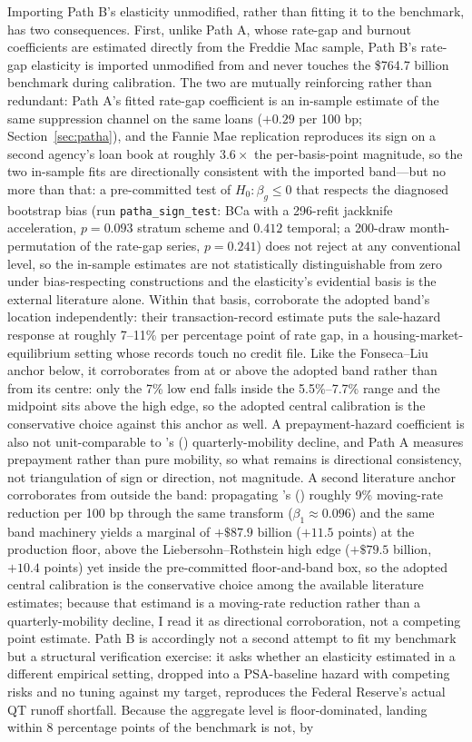 \documentclass[12pt]{article}
\newcommand{\citepos}[1]{\citeauthor{#1}'s (\citeyear{#1})}
\begin{document}
Importing Path B's elasticity unmodified, rather than fitting it to the benchmark, has two consequences. First, unlike Path A, whose rate-gap and burnout coefficients are estimated directly from the Freddie Mac sample, Path B's rate-gap elasticity is imported unmodified from \citet{liebersohn2024} and never touches the \$764.7 billion benchmark during calibration. The two are mutually reinforcing rather than redundant: Path A's fitted rate-gap coefficient is an in-sample estimate of the same suppression channel on the same loans ($+0.29$ per 100 bp; Section~\ref{sec:patha}), and the Fannie Mae replication reproduces its sign on a second agency's loan book at roughly $3.6\times$ the per-basis-point magnitude, so the two in-sample fits are directionally consistent with the imported band---but no more than that: a pre-committed test of $H_0\!: \beta_g \le 0$ that respects the diagnosed bootstrap bias (run \texttt{patha\_sign\_test}: BCa with a 296-refit jackknife acceleration, $p = 0.093$ stratum scheme and $0.412$ temporal; a 200-draw month-permutation of the rate-gap series, $p = 0.241$) does not reject at any conventional level, so the in-sample estimates are not statistically distinguishable from zero under bias-respecting constructions and the elasticity's evidential basis is the external literature alone. Within that basis, \citet{graybill2026} corroborate the adopted band's location independently: their transaction-record estimate puts the sale-hazard response at roughly 7--11\% per percentage point of rate gap, in a housing-market-equilibrium setting whose records touch no credit file. Like the Fonseca--Liu anchor below, it corroborates from at or above the adopted band rather than from its centre: only the 7\% low end falls inside the 5.5\%--7.7\% range and the midpoint sits above the high edge, so the adopted central calibration is the conservative choice against this anchor as well. A prepayment-hazard coefficient is also not unit-comparable to \citepos{liebersohn2024} quarterly-mobility decline, and Path A measures prepayment rather than pure mobility, so what remains is directional consistency, not triangulation of sign or direction, not magnitude. A second literature anchor corroborates from outside the band: propagating \citepos{fonseca2024} roughly 9\% moving-rate reduction per 100 bp through the same transform ($\beta_1 \approx 0.096$) and the same band machinery yields a marginal of $+\$87.9$ billion ($+11.5$ points) at the production floor, above the Liebersohn--Rothstein high edge ($+\$79.5$ billion, $+10.4$ points) yet inside the pre-committed floor-and-band box, so the adopted central calibration is the conservative choice among the available literature estimates; because that estimand is a moving-rate reduction rather than a quarterly-mobility decline, I read it as directional corroboration, not a competing point estimate. Path B is accordingly not a second attempt to fit my benchmark but a structural verification exercise: it asks whether an elasticity estimated in a different empirical setting, dropped into a PSA-baseline hazard with competing risks and no tuning against my target, reproduces the Federal Reserve's actual QT runoff shortfall. Because the aggregate level is floor-dominated, landing within 8 percentage points of the benchmark is not, by 
\end{document}
